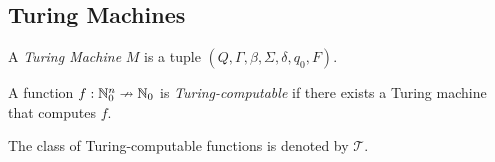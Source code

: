 
\subsection{Turing Machines}

\begin{definition}
	A \emph{Turing Machine} $M$ is a tuple $(Q, \Gamma, \beta, \Sigma, \delta, q_0, F)$. 
\end{definition}

\begin{definition}
	A function $f: \mathbb{N}_0^n \nrightarrow \mathbb{N}_0$ is \emph{Turing-computable} if there exists a Turing machine that computes $f$. 
\end{definition}
The class of Turing-computable functions is denoted by $\mathcal{T}$.
